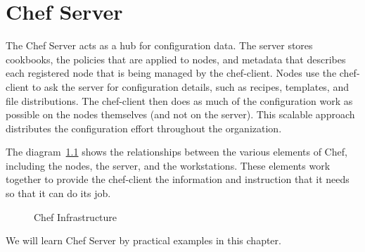 \chapter{Chef Server}

The Chef Server acts as a hub for configuration data. The server stores cookbooks, the policies that are applied to nodes, and metadata that describes each registered node that is being managed by the chef-client. Nodes use the chef-client to ask the server for configuration details, such as recipes, templates, and file distributions. The chef-client then does as much of the configuration work as possible on the nodes themselves (and not on the server). This scalable approach distributes the configuration effort throughout the organization.

The diagram~\ref{fig:overview_chef_draft} shows the relationships between the various elements of Chef, including the nodes, the server, and the workstations. These elements work together to provide the chef-client the information and instruction that it needs so that it can do its job.

\begin{figure}[ht!]
  \caption{Chef Infrastructure}
  \label{fig:overview_chef_draft}
\end{figure}

We will learn Chef Server by practical examples in this chapter.



